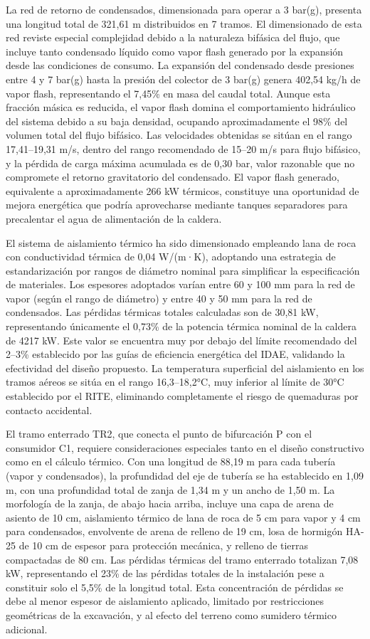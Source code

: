 \documentclass[12pt]{article}
\begin{document}
La red de retorno de condensados, dimensionada para operar a 3 bar(g), presenta una longitud total de 321,61 m distribuidos en 7 tramos. El dimensionado de esta red reviste especial complejidad debido a la naturaleza bifásica del flujo, que incluye tanto condensado líquido como vapor flash generado por la expansión desde las condiciones de consumo. La expansión del condensado desde presiones entre 4 y 7 bar(g) hasta la presión del colector de 3 bar(g) genera 402,54 kg/h de vapor flash, representando el 7,45\% en masa del caudal total. Aunque esta fracción másica es reducida, el vapor flash domina el comportamiento hidráulico del sistema debido a su baja densidad, ocupando aproximadamente el 98\% del volumen total del flujo bifásico. Las velocidades obtenidas se sitúan en el rango 17,41--19,31 m/s, dentro del rango recomendado de 15--20 m/s para flujo bifásico, y la pérdida de carga máxima acumulada es de 0,30 bar, valor razonable que no compromete el retorno gravitatorio del condensado. El vapor flash generado, equivalente a aproximadamente 266 kW térmicos, constituye una oportunidad de mejora energética que podría aprovecharse mediante tanques separadores para precalentar el agua de alimentación de la caldera.

El sistema de aislamiento térmico ha sido dimensionado empleando lana de roca con conductividad térmica de 0,04 W/(m·K), adoptando una estrategia de estandarización por rangos de diámetro nominal para simplificar la especificación de materiales. Los espesores adoptados varían entre 60 y 100 mm para la red de vapor (según el rango de diámetro) y entre 40 y 50 mm para la red de condensados. Las pérdidas térmicas totales calculadas son de 30,81 kW, representando únicamente el 0,73\% de la potencia térmica nominal de la caldera de 4217 kW. Este valor se encuentra muy por debajo del límite recomendado del 2--3\% establecido por las guías de eficiencia energética del IDAE, validando la efectividad del diseño propuesto. La temperatura superficial del aislamiento en los tramos aéreos se sitúa en el rango 16,3--18,2°C, muy inferior al límite de 30°C establecido por el RITE, eliminando completamente el riesgo de quemaduras por contacto accidental.

El tramo enterrado TR2, que conecta el punto de bifurcación P con el consumidor C1, requiere consideraciones especiales tanto en el diseño constructivo como en el cálculo térmico. Con una longitud de 88,19 m para cada tubería (vapor y condensados), la profundidad del eje de tubería se ha establecido en 1,09 m, con una profundidad total de zanja de 1,34 m y un ancho de 1,50 m. La morfología de la zanja, de abajo hacia arriba, incluye una capa de arena de asiento de 10 cm, aislamiento térmico de lana de roca de 5 cm para vapor y 4 cm para condensados, envolvente de arena de relleno de 19 cm, losa de hormigón HA-25 de 10 cm de espesor para protección mecánica, y relleno de tierras compactadas de 80 cm. Las pérdidas térmicas del tramo enterrado totalizan 7,08 kW, representando el 23\% de las pérdidas totales de la instalación pese a constituir solo el 5,5\% de la longitud total. Esta concentración de pérdidas se debe al menor espesor de aislamiento aplicado, limitado por restricciones geométricas de la excavación, y al efecto del terreno como sumidero térmico adicional.
\end{document}
